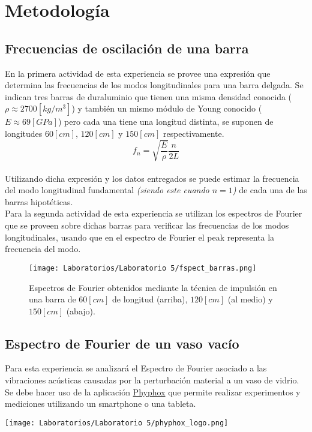 \documentclass[letterpaper,11pt]{article} %
\begin{document}
\section{Metodología}
\subsection{Frecuencias de oscilación de una barra}

En la primera actividad de esta experiencia se provee una expresión que determina las frecuencias de los modos longitudinales para una barra delgada. Se indican tres barras de duraluminio que tienen una misma densidad conocida ($\rho \approx 2700 [kg/m^3]$) y también un mismo módulo de Young conocido ($E \approx 69 [GPa]$) pero cada una tiene una longitud distinta, se suponen de longitudes $60 [cm]$, $120 [cm]$ y $150 [cm]$ respectivamente.\\
$$ f_n = \sqrt{\frac{E}{\rho}} \frac{n}{2L} $$
\\

Utilizando dicha expresión y los datos entregados se puede estimar la frecuencia del modo longitudinal fundamental \textit{(siendo este cuando $n=1$)} de cada una de las barras hipotéticas. \\

Para la segunda actividad de esta experiencia se utilizan los espectros de Fourier que se proveen sobre dichas barras para verificar las frecuencias de los modos longitudinales, usando que en el espectro de Fourier el peak representa la frecuencia del modo.

\begin{figure}
    \centering
    \texttt{[image: Laboratorios/Laboratorio 5/fspect\_barras.png]}
    \caption{Espectros de Fourier obtenidos mediante la técnica de impulsión en una barra de $60[cm]$ de longitud (arriba), $120[cm]$ (al medio) y $150 [cm]$ (abajo).}
    \label{FSpectrum_barras}
\end{figure}
\newpage

\subsection{Espectro de Fourier de un vaso vacío}

Para esta experiencia se analizará el Espectro de Fourier asociado a las vibraciones acústicas causadas por la perturbación material a un vaso de vidrio. Se debe hacer uso de la aplicación \href{https://phyphox.org/}{Phyphox} que permite realizar experimentos y mediciones utilizando un smartphone o una tableta. \\
\begin{center}
\texttt{[image: Laboratorios/Laboratorio 5/phyphox\_logo.png]}
\end{center}
 
\end{document}
